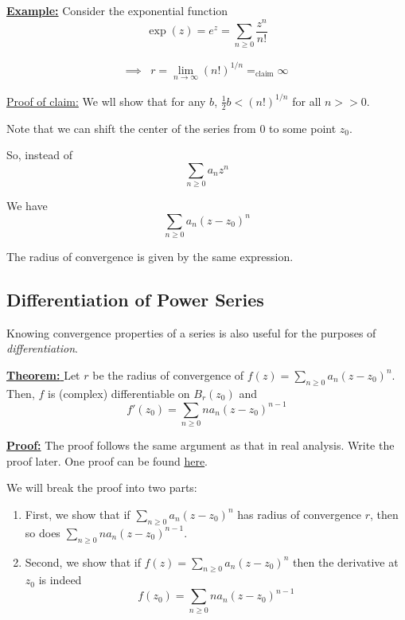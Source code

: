 \documentclass{article}
\begin{document}
\vskip 0.5cm
\underline{\textbf{Example:}} Consider the exponential function
\[ \exp(z) = e^{z} = \sum_{n \geq 0} \frac{z^n}{n!} \]

\begin{align*}
  \implies &r = \lim_{n \rightarrow \infty} (n!)^{1/n} =_{\text{claim}} \infty
\end{align*}

\vskip 0.5cm
\underline{Proof of claim:} We wll show that for any $b$, $\frac{1}{2}b < (n!)^{1/n}$ for all $n >> 0$.


Note that we can shift the center of the series from $0$ to some point $z_0$.

So, instead of 
\[ \sum_{n \geq 0} a_n z^n \]

We have
\[ \sum_{n \geq 0} a_n (z - z_0)^n \]

The radius of convergence is given by the same expression.

\vskip 1cm
\subsection{Differentiation of Power Series}
Knowing convergence properties of a series is also useful for the purposes of \emph{differentiation}.

\begin{dottedbox}
  \underline{\textbf{Theorem: }} Let $r$ be the radius of convergence of $f(z) = \sum_{n \geq 0} a_n (z - z_0)^n$. Then, $f$ is (complex) differentiable on $B_r(z_0)$ and 
  \[ f'(z_0) = \sum_{n \geq 0} n a_n (z - z_0)^{n-1} \]

  \vskip 0.5cm
  \underline{\textbf{Proof:}}
  The proof follows the same argument as that in real analysis. Write the proof later. One proof can be found \href{https://proofwiki.org/wiki/Derivative_of_Complex_Power_Series/Proof_1}{here}.
\end{dottedbox}

We will break the proof into two parts:
\begin{enumerate}[label=(\alph*)]
  \item First, we show that if $\sum_{n \geq 0} a_n(z - z_0)^n$ has radius of convergence $r$, then so does $\sum_{n \geq 0} n a_n(z - z_0)^{n-1}$.
  \item Second, we show that if $f(z) = \sum_{n \geq 0} a_n(z - z_0)^n$ then the derivative at $z_0$ is indeed 
  \[ f(z_0) = \sum_{n \geq 0} n a_n(z - z_0)^{n-1} \]
\end{enumerate}
\end{document}
